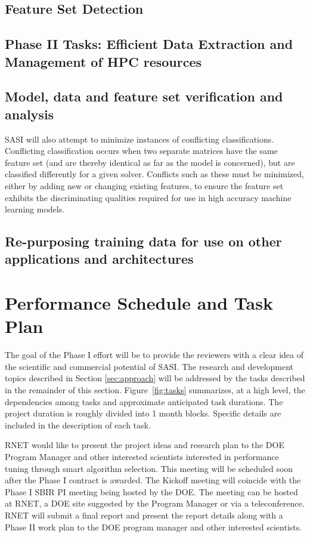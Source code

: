 \subsection{Feature Set Detection}

\subsection{ Phase II Tasks: Efficient Data Extraction and Management of HPC resources } 


\subsection{ Model, data and feature set verification and analysis } 


SASI will also attempt to minimize instances of conflicting classifications. Conflicting classification occurs when two separate matrices have the same feature set (and are thereby identical as far as the model is concerned), but are classified differently for a given solver. Conflicts such as these must be minimized, either by adding new or changing existing features,  to ensure the feature set exhibits the discriminating qualities required for use in high accuracy machine learning models. 


\subsection{ Re-purposing training data for use on other applications and architectures }



\section{Performance Schedule and Task Plan}
\label{sec:taskplan}

The goal of the Phase I effort will be to provide the reviewers with a clear idea 
of the scientific and commercial potential of SASI. The research and development topics 
described in Section \ref{sec:approach} will be addressed by the tasks described in the remainder of this section. 
Figure~\ref{fig:tasks} summarizes, at a high level, the dependencies among tasks 
and approximate anticipated task durations. The project duration is roughly 
divided into 1 month blocks. Specific details are included in the description 
of each task. 

RNET would like to present the project ideas and research plan to the DOE 
Program Manager and other interested scientists interested in performance tuning
through smart algorithm selection. This meeting will 
be scheduled soon after the Phase I contract is awarded. The Kickoff meeting 
will coincide with the Phase I SBIR PI meeting being hosted by the DOE. The 
meeting can be hosted at RNET, a DOE site suggested by the Program Manager or 
via a teleconference. RNET will submit a final report and present the report 
details along with a Phase II work plan to the DOE program manager and other 
interested scientists.

